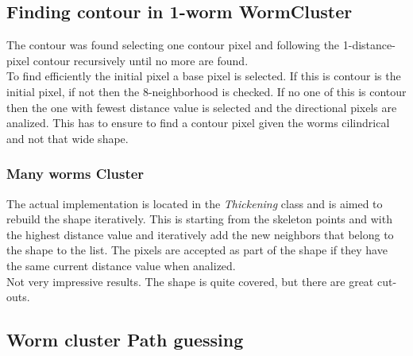 \documentclass{article}
\begin{document}
\subsection{Finding contour in 1-worm WormCluster}
The contour was found selecting one contour pixel and following the 
1-distance-pixel contour recursively until no more are found.\\
To find efficiently the initial pixel a base pixel is selected. If this
is contour is the initial pixel, if not then the 8-neighborhood is checked.
If no one of this is contour then the one with fewest distance value is selected
and the directional pixels are analized. This has to ensure to find a contour
pixel given the worms cilindrical and not that wide shape.

\subsubsection{Many worms Cluster}
The actual implementation is located in the \emph{Thickening} class and is 
aimed to rebuild the shape iteratively. This is starting from the 
skeleton points and with the highest distance value and iteratively add
the new neighbors that belong to the shape to the list. The pixels are
accepted as part of the shape if they have the same current distance value
when analized. \\

Not very impressive results. The shape is quite covered, but there are 
great cut-outs.


\subsection{Worm cluster Path  guessing}
\end{document}
